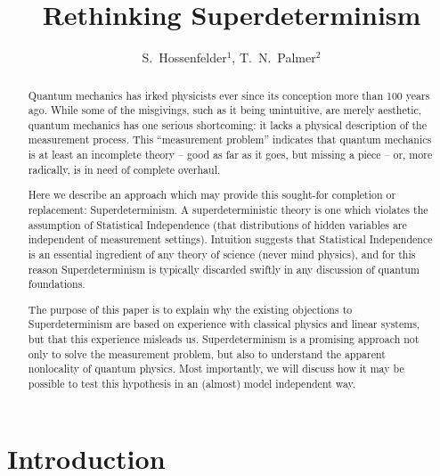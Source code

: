 \documentclass[12pt]{article}
\begin{document}
\title{Rethinking Superdeterminism}
\author{S.~Hossenfelder$^{1}$, T.~N.~Palmer$^{2}$}

\date{}
\maketitle
\vspace*{-1cm}


\begin{abstract}
Quantum mechanics has irked physicists ever since its conception more than 100 years ago. 
While some of the misgivings, such as it being unintuitive, are merely aesthetic, 
quantum mechanics has one serious shortcoming: it lacks a physical description of the
measurement process. This ``measurement problem''  indicates that quantum 
mechanics is at least an incomplete theory -- good as far as it goes, but missing a piece -- or, more radically, is in need of complete overhaul.

Here we describe an approach which may provide this sought-for completion or replacement: Superdeterminism. A superdeterministic theory is one which violates the assumption of Statistical Independence (that distributions of hidden variables are independent of measurement settings). Intuition suggests that Statistical Independence is an essential ingredient of any theory of science (never mind physics), and for this reason Superdeterminism is typically discarded swiftly in any discussion of quantum foundations. 

The purpose of this paper is to explain why the existing objections to Superdeterminism are based on experience with classical physics and linear systems, but that this experience
misleads us. Superdeterminism is a promising approach not only to solve the measurement problem, but also to understand the apparent 
nonlocality of quantum physics. Most importantly, we will discuss how it may be possible to test this hypothesis in an (almost) model independent way.

\end{abstract}

\section{Introduction}
\end{document}

